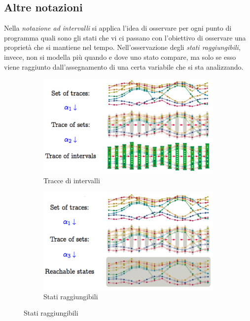 \documentclass[a4paper,oneside,titlepage]{book}
\begin{document}
\subsection{Altre notazioni}
Nella \textit{notazione ad intervalli} si applica l'idea di osservare per ogni punto di programma quali sono gli stati che vi ci passano con l'obiettivo di osservare una proprietà che si mantiene nel tempo. Nell'osservazione degli \textit{stati raggiungibili}, invece, non si modella più quando e dove uno stato compare, ma solo se esso viene raggiunto dall'assegnamento di una certa variabile che si sta analizzando.
\begin{figure}[htp]
	\begin{subfigure}{0.49\textwidth}
	    \centering
		\includegraphics[width=\textwidth, height=\textheight, keepaspectratio]{not1.png}
		\caption{Tracce di intervalli}
	\end{subfigure}
	\hfill
	\begin{subfigure}{0.49\textwidth}
	    \centering
		\includegraphics[width=\textwidth, height=\textheight, keepaspectratio]{not2.png} 
		\caption{Stati raggiungibili}
	\end{subfigure}
\end{figure}
\end{document}
